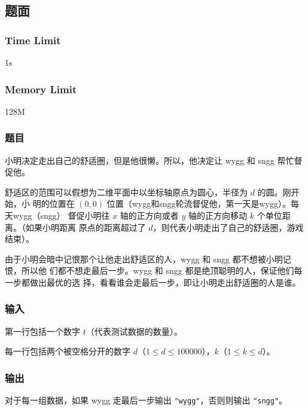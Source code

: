 \subsection{题面}

\subsubsection{Time Limit}
1s

\subsubsection{Memory Limit}
128M

\subsubsection{题目}
小明决定走出自己的舒适圈，但是他很懒。所以，他决定让 wygg 和 sngg 帮忙督促他。

舒适区的范围可以假想为二维平面中以坐标轴原点为圆心，半径为 $d$ 的圆。刚开始，小
明的位置在 $(0,0)$ 位置（wygg和sngg轮流督促他，第一天是wygg）。每天wygg（sngg）
督促小明往 $x$ 轴的正方向或者 $y$ 轴的正方向移动 $k$ 个单位距离。（如果小明距离
原点的距离超过了 $d$，则代表小明走出了自己的舒适圈，游戏结束）。

由于小明会暗中记恨那个让他走出舒适区的人，wygg 和 sngg 都不想被小明记恨，所以他
们都不想走最后一步。wygg 和 sngg 都是绝顶聪明的人，保证他们每一步都做出最优的选
择，看看谁会走最后一步，即让小明走出舒适圈的人是谁。

\subsubsection{输入}
第一行包括一个数字 $t$（代表测试数据的数量）。

每一行包括两个被空格分开的数字 $d$（$1 \leq d \leq 100000$），$k$（$1 \leq k \leq
d$）。

\subsubsection{输出}
对于每一组数据，如果 wygg 走最后一步输出 \verb|"wygg"|，否则则输出 \verb|"sngg"|。

